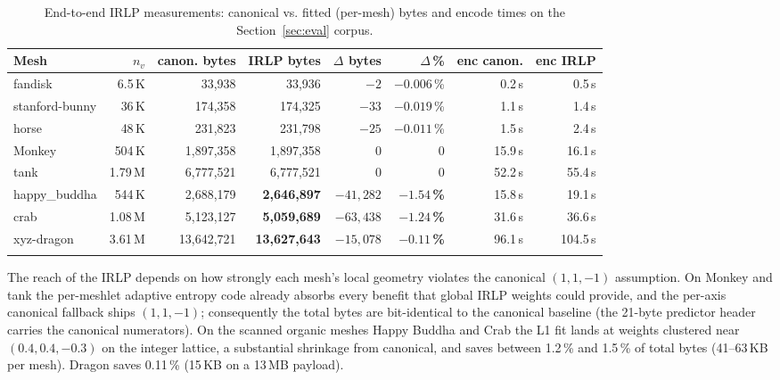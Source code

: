 \documentclass[pdflatex,sn-vancouver-num]{sn-jnl}%
\theoremstyle{thmstyleone}%
\theoremstyle{thmstyletwo}%
\theoremstyle{thmstylethree}%
\begin{document}
\begin{table}[ht]
\caption{End-to-end IRLP measurements: canonical vs. fitted (per-mesh) bytes and encode times on the Section~\ref{sec:eval} corpus.}\label{tab:irlp}
\footnotesize
\setlength{\tabcolsep}{4pt}
\begin{tabular*}{\textwidth}{@{\extracolsep\fill}lrrrrrrr@{}}
\toprule
Mesh & $n_v$ & canon. bytes & IRLP bytes & $\Delta$ bytes & $\Delta$\,\% & enc canon. & enc IRLP \\
\midrule
fandisk        & 6.5\,K  & 33{,}938    & 33{,}936    & $-2$       & $-0.006$\,\%  & 0.2\,s   & 0.5\,s   \\
stanford-bunny & 36\,K   & 174{,}358   & 174{,}325   & $-33$      & $-0.019$\,\%  & 1.1\,s   & 1.4\,s   \\
horse          & 48\,K   & 231{,}823   & 231{,}798   & $-25$      & $-0.011$\,\%  & 1.5\,s   & 2.4\,s   \\
Monkey         & 504\,K  & 1{,}897{,}358 & 1{,}897{,}358 & 0      & 0             & 15.9\,s  & 16.1\,s  \\
tank           & 1.79\,M & 6{,}777{,}521 & 6{,}777{,}521 & 0      & 0             & 52.2\,s  & 55.4\,s  \\
happy\_buddha  & 544\,K  & 2{,}688{,}179 & \textbf{2{,}646{,}897} & \textbf{$-41{,}282$} & \textbf{$-1.54$\,\%} & 15.8\,s  & 19.1\,s  \\
crab           & 1.08\,M & 5{,}123{,}127 & \textbf{5{,}059{,}689} & \textbf{$-63{,}438$} & \textbf{$-1.24$\,\%} & 31.6\,s  & 36.6\,s  \\
xyz-dragon     & 3.61\,M & 13{,}642{,}721 & \textbf{13{,}627{,}643} & \textbf{$-15{,}078$} & \textbf{$-0.11$\,\%} & 96.1\,s & 104.5\,s \\
\botrule
\end{tabular*}
\end{table}

The reach of the IRLP depends on how strongly each mesh's local geometry violates the canonical $(1, 1, -1)$ assumption. On Monkey and tank the per-meshlet adaptive entropy code already absorbs every benefit that global IRLP weights could provide, and the per-axis canonical fallback ships $(1, 1, -1)$; consequently the total bytes are bit-identical to the canonical baseline (the 21-byte predictor header carries the canonical numerators). On the scanned organic meshes Happy Buddha and Crab the L1 fit lands at weights clustered near $(0.4, 0.4, -0.3)$ on the integer lattice, a substantial shrinkage from canonical, and saves between 1.2\,\% and 1.5\,\% of total bytes (41--63\,KB per mesh). Dragon saves 0.11\,\% (15\,KB on a 13\,MB payload).
\end{document}
